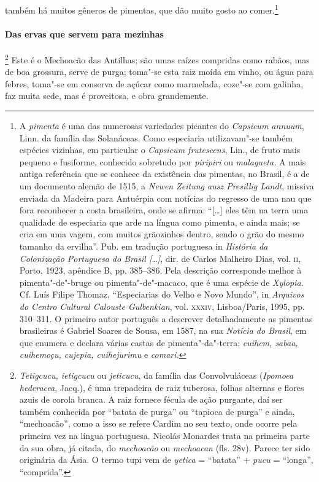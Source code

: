 também há muitos gêneros de pimentas, que dão muito gosto ao 
comer.\footnote{ A \textit{pimenta} é uma das numerosas variedades picantes
do \textit{Capsicum annuum}, Linn. da família das Solanáceas. Como
especiaria utilizavam"-se também espécies vizinhas, em particular o
\textit{Capsicum frutescens}, Lin., de fruto mais pequeno e fusiforme,
conhecido sobretudo por \textit{piripiri} ou \textit{malagueta.} A mais
antiga referência que se conhece da existência das pimentas, no
Brasil, é a de um documento alemão de 1515, a \textit{Newen Zeitung
ausz Presillig Landt}, missiva enviada da Madeira para Antuérpia com
notícias do regresso de uma nau que fora reconhecer a costa brasileira,
onde se afirma: ``[\ldots] eles têm na terra uma qualidade de especiaria
que arde na língua como pimenta, e ainda mais; se cria em uma vagem,
com muitos grãozinhos dentro, sendo o grão do mesmo tamanho da
ervilha''. Pub. em tradução portuguesa in \textit{História da
Colonização Portuguesa do Brasil [\ldots]}, dir. de Carlos Malheiro Dias,
vol. \textsc{ii}, Porto, 1923, apêndice B, pp. 385--386. Pela descrição
corresponde melhor à pimenta"-de"-bruge ou pimenta"-de"-macaco, que é uma
espécie de \textit{Xylopia.} Cf. Luís Filipe Thomaz, ``Especiarias do
Velho e Novo Mundo'', in \textit{Arquivos do Centro Cultural Calouste
Gulbenkian}, vol. \textsc{xxxiv}, Lisboa/Paris, 1995, pp. 310--311. O primeiro
autor português a descrever detalhadamente as pimentas brasileiras é
Gabriel Soares de Sousa, em 1587, na sua \textit{Notícia do Brasil}, 
em que enumera e declara várias castas de pimenta"-da"-terra:
\textit{cuihem, sabaa, cuihemoçu, cujepia, cuihejurimu} e \textit{comari.}} 

\paragraph{Das ervas que servem para mezinhas}

\footnote{ \textit{Tetigcucu, ietigcucu} ou
\textit{jeticucu}, da família das Convolvuláceas (\textit{Ipomoea
hederacea}, Jacq.), é uma trepadeira de raiz tuberosa, folhas alternas e
flores azuis de corola branca. A raiz fornece fécula de ação purgante,
daí ser também conhecida por ``batata de purga'' ou ``tapioca de purga'' e
ainda, ``mechoacão'', como a isso se refere Cardim no seu texto, onde
ocorre pela primeira vez na língua portuguesa. Nicolás Monardes trata
na primeira parte da sua obra, já citada, do \textit{mechoacão} ou
\textit{mechoacan} (fls. 28v). Parece ter sido originária da Ásia. O
termo tupi vem de \textit{yetica} = ``batata'' + \textit{pucu} = ``longa'',
``comprida''.} Este é o Mechoacão das Antilhas; são umas
raízes compridas como rabãos, mas de boa grossura, serve de purga;
toma"-se esta raiz moída em vinho, ou água para febres, toma"-se em
conserva de açúcar como marmelada, coze"-se com galinha, faz muita sede,
mas é proveitosa, e obra grandemente.


